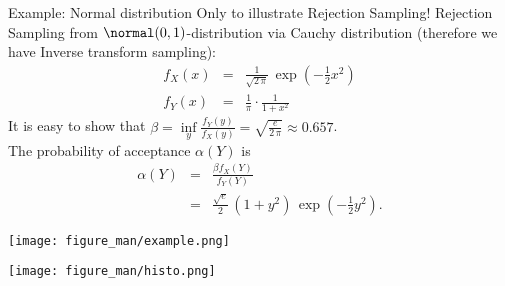 \documentclass[11pt,compress,t,notes=noshow, xcolor=table]{beamer}
\begin{document}
\begin{vbframe}{Example: Normal distribution}
Only to illustrate Rejection Sampling!
Rejection Sampling from $\normal(0,1)$-distribution via
Cauchy distribution (therefore we have Inverse transform sampling):
    \begin{eqnarray*}
        f_X(x) & = & \frac{1}{\sqrt{2\,\pi}} \,
            \exp(-\frac{1}{2}x^2) \\
        f_Y(x) & = & \frac{1}{\pi} \cdot \frac{1}{1 + x^2}
    \end{eqnarray*}
    It is easy to show that $\beta = \inf\limits_y \frac{f_Y(y)}{f_X(y)}
    = \sqrt{\frac{e}{2\,\pi}} \approx 0.657$. \\
    The probability of acceptance $\alpha(Y)$ is
    \begin{eqnarray*}
    \alpha(Y) &=& \frac{\beta f_X(Y)}{ f_Y(Y)} \\
              &=&  \frac{\sqrt{e}}{2} \, (1 + y^2) \,
                    \exp(-\frac{1}{2}y^2).
    \end{eqnarray*}

\framebreak

\lz

\begin{center}
\texttt{[image: figure\_man/example.png]}
\end{center}




\framebreak
\lz

\begin{center}
\texttt{[image: figure\_man/histo.png]}
\end{center}


\end{vbframe}
\end{document}

